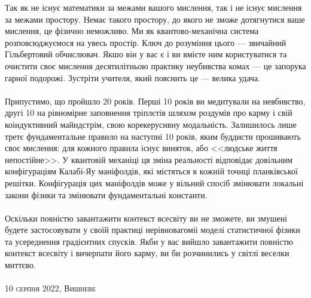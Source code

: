 \newpage
Так як не існує математики за межами вашого мислення, так і не існує мислення за межами простору.
Немає такого простору, до якого не зможе дотягнутися ваше мислення, це фізично неможливо. Ми як
квантово-механічна система розповсюджуємося на увесь простір. Ключ до розуміння цього ---
звичайний Гільбертовий обчислювач. Якшо він у вас є і ви вмієте ним користуватися та очистити своє
мислення десятилітньою практику неубивства комах --- це запорука гарної подорожі. Зустріти учителя,
який пояснить це --- велика удача.
\\
\\
Припустимо, що пройшло 20 років. Перші 10 років ви медитували на невбивство, другі 10 на рівномірне
заповнення тріплєтів шляхом роздумів про карму і свій коіндуктивний майндстрім, свою корекерусивну
модальність. Залишилось лише третє фундаментальне правило на наступні 10 років, яким буддисти прошивають
своє мислення: для кожного правила існує виняток, або <<людське життя непостійне>>. У квантовій механіці
ця зміна реальності відповідає довільним конфігураціям Калабі-Яу маніфолдів, які містяться в кожній точнці
планківської решітки. Конфігурація цих маніфолдів може у вільний спосіб змінювати локальні закони фізики та
змінювати фундаментальні константи.
\\
\\
Оскільки повністю завантажити контекст всесвіту ви не зможете, ви змушені будете застосовувати у
своїй практиці нерівновагоміі моделі статистичної фізики та усереднення градієнтних спусків. Якби у вас
вийшло завантажити повністю контекст всесвіту і вичерпати його карму, ви би розчинились у світлі веселки миттєво.
\\
\\
\textsc{\footnotesize 10 серпня 2022, Вишневе}

\normalsize
